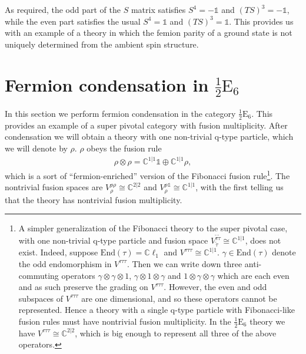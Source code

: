 \documentclass[12pt,a4paper]{article}
\newcommand{\tp}{\otimes}
\newcommand{\unit}{\mathds{1}}
\newcommand{\cc}{\mathbb{C}}
\newcommand{\halfesix}{\frac{1}{2}\text{E}_6}
\begin{document}
As required, the odd part of the $S$ matrix satisfies $S^4 = -\unit$ and $(TS)^3 = -\unit$, while the even part satisfies the usual $S^4 = \unit$ and $(TS)^3 = \unit$. 
This provides us with an example of a theory in which the femion parity of a ground state 
is not uniquely determined from the ambient spin structure. 



\section{Fermion condensation in $\halfesix$} \label{halfesix}

In this section we perform fermion condensation in the category $\halfesix$.
This provides an example of a super pivotal category with fusion multiplicity.
After condensation we will obtain a theory with one non-trivial q-type particle, 
which we will denote by $\rho$. 
$\rho$ obeys the fusion rule
\begin{align}
\rho \tp \rho = \mathbb{C}^{1|1} \mathds{1} \oplus \mathbb{C}^{1|1} \rho,
\end{align}
which is a sort of ``fermion-enriched'' version of the Fibonacci fusion rule\footnote{A simpler generalization of the Fibonacci theory to the super pivotal case, with one non-trivial q-type particle and fusion space $V^{\tilde{\tau} \tilde{\tau}}_{\tilde {\tau}}\cong \mathbb{C}^{1|1}$, does not exist. Indeed, suppose $\text{End}(\tau) = \mathbb{C} \ell_1$ and $V^{\tau \tau \tau} \cong \mathbb{C}^{1|1}$.
$\gamma \in \text{End}(\tau)$ denote the odd endomorphism in $V^{\tau\tau\tau}$.
Then we can write down three anti-commuting operators $\gamma \tp \gamma \tp 1$, $\gamma \tp 1 \tp \gamma$ and $1\tp \gamma \tp \gamma$ which are each even and as such preserve the grading on $V^{\tau\tau\tau}$. 
However, the even and odd subspaces of $V^{\tau\tau\tau}$ are one dimensional, and so these operators cannot be represented.
Hence a theory with a single q-type particle with Fibonacci-like fusion rules must have nontrivial fusion multiplicity.
In the $\halfesix$ theory we have $V^{\tau\tau\tau} \cong \cc^{2|2}$, which is big enough to represent all three of the above operators.}.
The nontrivial fusion spaces are $V^{\rho\rho}_\rho \cong \cc^{2|2}$ and $V^{\rho\unit}_\rho \cong \cc^{1|1}$, with the first telling us that the theory has nontrivial fusion multiplicity. 
\end{document}
